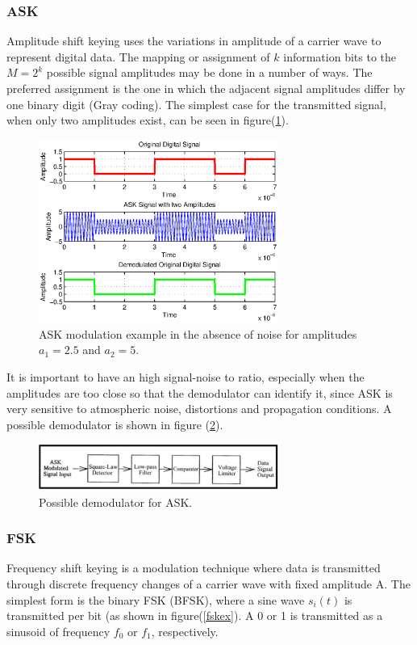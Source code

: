 \documentclass[12pt,a4paper,openright]{article}
\begin{document}
\subsubsection{ASK}
Amplitude shift keying uses the variations in amplitude of a carrier wave to represent digital data. The mapping or assignment of $k$ information bits to the $M=2^k$ possible signal amplitudes may be done in a number of ways. The preferred assignment is the one in which the adjacent  signal amplitudes differ by one binary digit (Gray coding). The simplest case for the transmitted signal, when only two amplitudes exist, can be seen in figure(\ref{ask}). 

\begin{figure}[h]
  \centering
    \includegraphics[width=0.7\textwidth]{ASKexample.eps}
    \caption{ASK modulation example in the absence of noise for amplitudes $a_1=2.5$ and $a_2=5$.}
    \label{ask}
\end{figure}

It is important to have an high signal-noise to ratio, especially when the amplitudes are too close so that the demodulator can identify it, since ASK is very sensitive to atmospheric noise, distortions and propagation conditions.  A possible demodulator is shown in figure (\ref{askdem}).

\begin{figure}[h]
  \centering
    \includegraphics[width=0.7\textwidth]{askdem.pdf}
    \caption{Possible demodulator for ASK.}
    \label{askdem}
\end{figure}

\subsubsection{FSK}
\label{fsk}
Frequency shift keying is a modulation technique where data is transmitted through discrete frequency changes of a carrier wave with fixed amplitude A. The simplest form is the binary FSK (BFSK), where a sine wave $s_i(t)$ is transmitted per bit (as shown in figure(\ref{fskex}). A 0 or 1 is transmitted as a sinusoid of frequency $f_0$ or $f_1$, respectively. 
\end{document}
